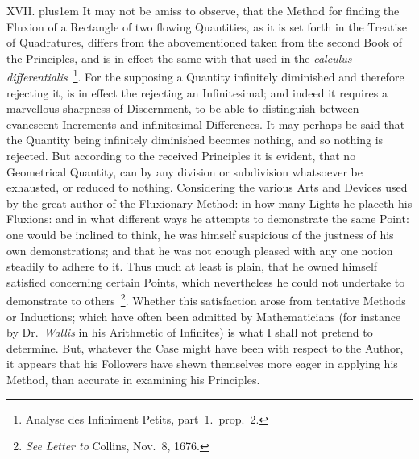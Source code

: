 
\medbreak

XVII. \hskip 0pt plus1em
It may not be amiss to observe, that the Method for finding the
Fluxion of a Rectangle of two flowing Quantities, as it is set
forth in the Treatise of Quadratures, differs from the
abovementioned taken from the second Book of the Principles, and
is in effect the same with that used in the {\it calculus
differentialis}~\footnote*{Analyse des Infiniment Petits,
part~1.\ prop.~2.}.
For the supposing a Quantity infinitely diminished and therefore
rejecting it, is in effect the rejecting an Infinitesimal; and
indeed it requires a marvellous sharpness of Discernment, to be
able to distinguish between evanescent Increments and
infinitesimal Differences.  It may perhaps be said that the
Quantity being infinitely diminished becomes nothing, and so
nothing is rejected.  But according to the received Principles it
is evident, that no Geometrical Quantity, can by any division or
subdivision whatsoever be exhausted, or reduced to nothing.
Considering the various Arts and Devices used by the great author
of the Fluxionary Method: in how many Lights he placeth his
Fluxions: and in what different ways he attempts to demonstrate
the same Point: one would be inclined to think, he was himself
suspicious of the justness of his own demonstrations; and that he
was not enough pleased with any one notion steadily to adhere to
it.  Thus much at least is plain, that he owned himself satisfied
concerning certain Points, which nevertheless he could not
undertake to demonstrate to others~\footnote*{{\it See
Letter to\/} Collins, Nov.~8, 1676.}.
Whether this satisfaction arose from tentative Methods or
Inductions; which have often been admitted by Mathematicians (for
instance by Dr.~{\it Wallis} in his Arithmetic of Infinites) is
what I shall not pretend to determine.  But, whatever the Case
might have been with respect to the Author, it appears that his
Followers have shewn themselves more eager in applying his
Method, than accurate in examining his Principles.



\medbreak

